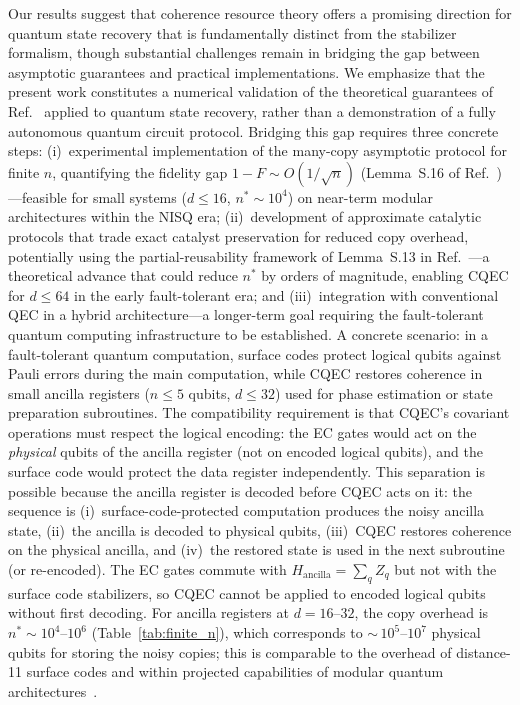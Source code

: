 \documentclass[prx,twocolumn,superscriptaddress,longbibliography,floatfix]{revtex4-2}
\begin{document}
Our results suggest that coherence resource theory offers a promising direction for quantum state recovery that is fundamentally distinct from the stabilizer formalism, though substantial challenges remain in bridging the gap between asymptotic guarantees and practical implementations.
We emphasize that the present work constitutes a numerical validation of the theoretical guarantees of Ref.~\cite{Shiraishi2024} applied to quantum state recovery, rather than a demonstration of a fully autonomous quantum circuit protocol.
Bridging this gap requires three concrete steps:
(i)~experimental implementation of the many-copy asymptotic protocol for finite $n$, quantifying the fidelity gap $1 - F \sim O(1/\sqrt{n})$ (Lemma~S.16 of Ref.~\cite{Shiraishi2024})---feasible for small systems ($d \leq 16$, $n^* \sim 10^4$) on near-term modular architectures within the NISQ era;
(ii)~development of approximate catalytic protocols that trade exact catalyst preservation for reduced copy overhead, potentially using the partial-reusability framework of Lemma~S.13 in Ref.~\cite{Shiraishi2024}---a theoretical advance that could reduce $n^*$ by orders of magnitude, enabling CQEC for $d \leq 64$ in the early fault-tolerant era;
and (iii)~integration with conventional QEC in a hybrid architecture---a longer-term goal requiring the fault-tolerant quantum computing infrastructure to be established.
A concrete scenario: in a fault-tolerant quantum computation, surface codes protect logical qubits against Pauli errors during the main computation, while CQEC restores coherence in small ancilla registers ($n \leq 5$ qubits, $d \leq 32$) used for phase estimation or state preparation subroutines.
The compatibility requirement is that CQEC's covariant operations must respect the logical encoding: the EC gates would act on the \emph{physical} qubits of the ancilla register (not on encoded logical qubits), and the surface code would protect the data register independently.
This separation is possible because the ancilla register is decoded before CQEC acts on it: the sequence is (i)~surface-code-protected computation produces the noisy ancilla state, (ii)~the ancilla is decoded to physical qubits, (iii)~CQEC restores coherence on the physical ancilla, and (iv)~the restored state is used in the next subroutine (or re-encoded).
The EC gates commute with $H_\mathrm{ancilla} = \sum_q Z_q$ but not with the surface code stabilizers, so CQEC cannot be applied to encoded logical qubits without first decoding.
For ancilla registers at $d = 16$--$32$, the copy overhead is $n^* \sim 10^4$--$10^6$ (Table~\ref{tab:finite_n}), which corresponds to ${\sim}\,10^5$--$10^7$ physical qubits for storing the noisy copies; this is comparable to the overhead of distance-11 surface codes and within projected capabilities of modular quantum architectures~\cite{Fowler2012}.
\end{document}

